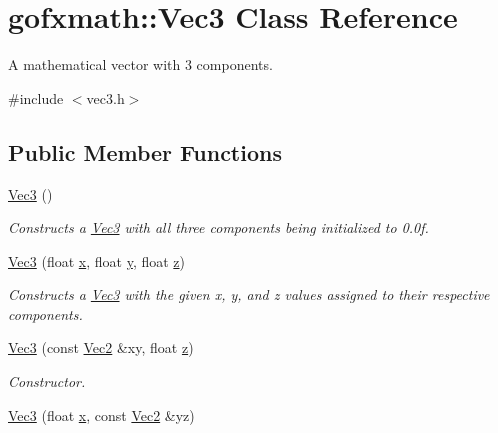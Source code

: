 \hypertarget{classgofxmath_1_1_vec3}{}\section{gofxmath\+:\+:Vec3 Class Reference}
\label{classgofxmath_1_1_vec3}


A mathematical vector with 3 components.  




{\ttfamily \#include $<$vec3.\+h$>$}

\subsection*{Public Member Functions}
\begin{DoxyCompactItemize}
\item 
\hyperlink{classgofxmath_1_1_vec3_a21a3f52051b2f4e2ab82ae5bc5d15566}{Vec3} ()
\begin{DoxyCompactList}\small\item\em Constructs a \hyperlink{classgofxmath_1_1_vec3}{Vec3} with all three components being initialized to 0.\+0f. \end{DoxyCompactList}\item 
\hyperlink{classgofxmath_1_1_vec3_a561d4237e4f4d437c90cdf359d6385f5}{Vec3} (float \hyperlink{classgofxmath_1_1_vec3_a507868ff65b4e42f80da14bf355ee10a}{x}, float \hyperlink{classgofxmath_1_1_vec3_afd348ae9f3c31f6215e91d8b5adcea5f}{y}, float \hyperlink{classgofxmath_1_1_vec3_a201779cb941bb4a6478ff13c897494ba}{z})
\begin{DoxyCompactList}\small\item\em Constructs a \hyperlink{classgofxmath_1_1_vec3}{Vec3} with the given x, y, and z values assigned to their respective components. \end{DoxyCompactList}\item 
\hyperlink{classgofxmath_1_1_vec3_a21acf0cd1c7271a16280c7f63887a128}{Vec3} (const \hyperlink{classgofxmath_1_1_vec2}{Vec2} \&xy, float \hyperlink{classgofxmath_1_1_vec3_a201779cb941bb4a6478ff13c897494ba}{z})
\begin{DoxyCompactList}\small\item\em Constructor. \end{DoxyCompactList}\item 
\hyperlink{classgofxmath_1_1_vec3_aa445359b4fd336dc73e4a58e656b5bd7}{Vec3} (float \hyperlink{classgofxmath_1_1_vec3_a507868ff65b4e42f80da14bf355ee10a}{x}, const \hyperlink{classgofxmath_1_1_vec2}{Vec2} \&yz)

\end{DoxyCompactItemize}
